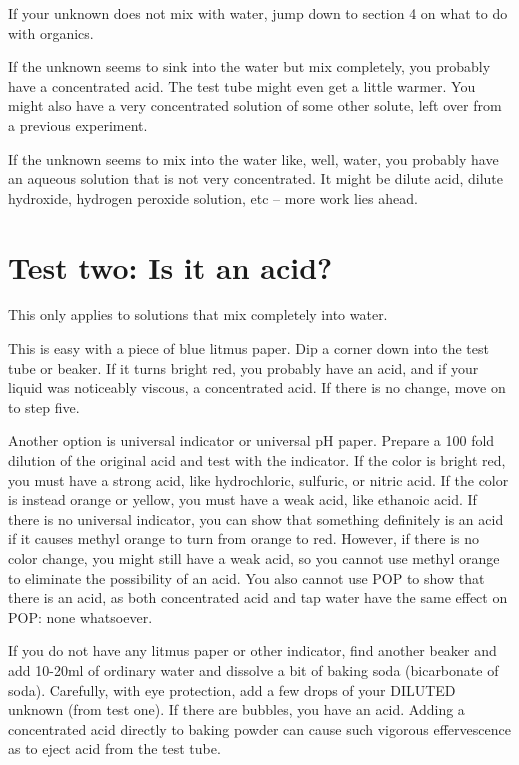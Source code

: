 If your unknown does not mix with water, 
jump down to section 4 on what to do with organics.

If the unknown seems to sink into the water but mix completely, 
you probably have a concentrated acid. 
The test tube might even get a little warmer. 
You might also have a very concentrated solution of some other solute, 
left over from a previous experiment.

If the unknown seems to mix into the water like, 
well, 
water, 
you probably have an aqueous solution that is not very concentrated. 
It might be dilute acid, 
dilute hydroxide, 
hydrogen peroxide solution, 
etc – more work lies ahead.

\section{Test two: Is it an acid?}

This only applies to solutions that mix completely into water.

This is easy with a piece of blue litmus paper. 
Dip a corner down into the test tube or beaker. 
If it turns bright red, 
you probably have an acid, 
and if your liquid was noticeably viscous, 
a concentrated acid. 
If there is no change, 
move on to step five.

Another option is universal indicator or universal pH paper. 
Prepare a 100 fold dilution of the original acid 
and test with the indicator. 
If the color is bright red, 
you must have a strong acid, 
like hydrochloric, 
sulfuric, 
or nitric acid. 
If the color is instead orange or yellow, 
you must have a weak acid, 
like ethanoic acid. 
If there is no universal indicator, 
you can show that something definitely is an acid 
if it causes methyl orange to turn from orange to red. 
However, 
if there is no color change, 
you might still have a weak acid, 
so you cannot use methyl orange to eliminate the possibility of an acid. 
You also cannot use POP to show that there is an acid, 
as both concentrated acid and tap water have the same effect on POP: 
none whatsoever.

If you do not have any litmus paper or other indicator, 
find another beaker and add 10-20ml of ordinary water 
and dissolve a bit of baking soda (bicarbonate of soda). 
Carefully, 
with eye protection, 
add a few drops of your DILUTED unknown (from test one). 
If there are bubbles, 
you have an acid. 
Adding a concentrated acid directly to baking powder 
can cause such vigorous effervescence as to eject acid from the test tube.

